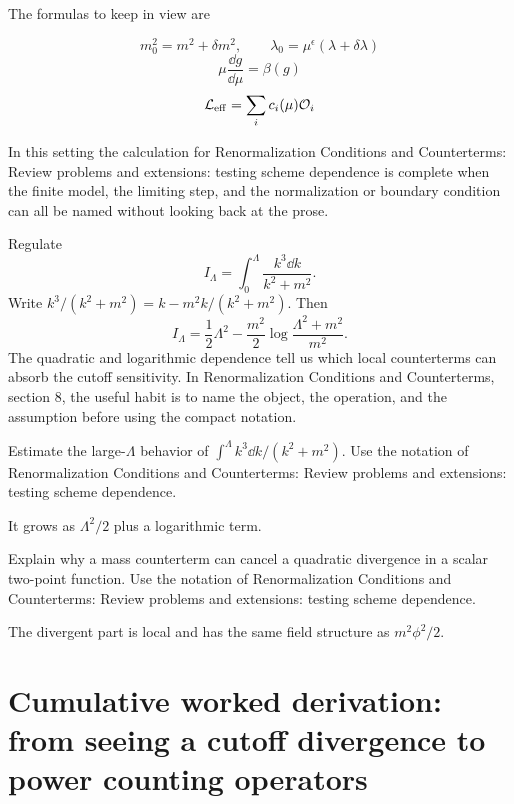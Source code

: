 The formulas to keep in view are

\[
  m_0^2=m^2+\delta m^2,\qquad \lambda_0=\mu^\epsilon(\lambda+\delta\lambda)
\]
\[
  \mu\frac{\dd g}{\dd\mu}=\beta(g)
\]
\[
  \mathcal L_{\mathrm{eff}}=\sum_i c_i(\mu)\mathcal O_i
\]

In this setting the calculation for Renormalization Conditions and Counterterms: Review problems and extensions: testing scheme dependence is complete when the finite model, the limiting step, and the normalization or boundary condition can all be named without looking back at the prose.




\begin{example}
Regulate
\[
  I_\Lambda=\int_0^\Lambda\frac{k^3\dd k}{k^2+m^2}.
\]
Write \(k^3/(k^2+m^2)=k-m^2k/(k^2+m^2)\).  Then
\[
  I_\Lambda=\frac12\Lambda^2-\frac{m^2}{2}\log\frac{\Lambda^2+m^2}{m^2}.
\]
The quadratic and logarithmic dependence tell us which local counterterms can absorb the cutoff sensitivity.  In Renormalization Conditions and Counterterms, section 8, the useful habit is to name the object, the operation, and the assumption before using the compact notation.
\end{example}



\begin{exercise}
Estimate the large-\(\Lambda\) behavior of \(\int^\Lambda k^3\dd k/(k^2+m^2)\).  Use the notation of Renormalization Conditions and Counterterms: Review problems and extensions: testing scheme dependence.
\begin{answer}
It grows as \(\Lambda^2/2\) plus a logarithmic term.
\end{answer}
\end{exercise}

\begin{exercise}
Explain why a mass counterterm can cancel a quadratic divergence in a scalar two-point function.  Use the notation of Renormalization Conditions and Counterterms: Review problems and extensions: testing scheme dependence.
\begin{answer}
The divergent part is local and has the same field structure as \(m^2\phi^2/2\).
\end{answer}
\end{exercise}



\section{Cumulative worked derivation: from seeing a cutoff divergence to power counting operators}

